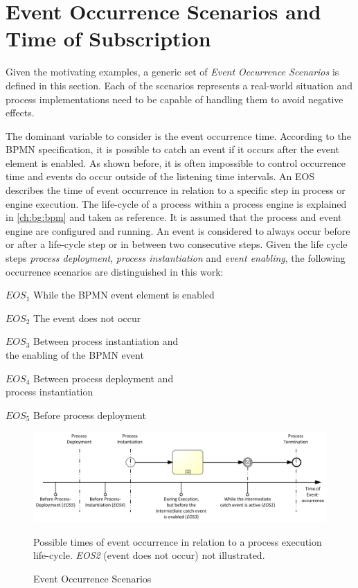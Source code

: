 \section{Event Occurrence Scenarios and Time of Subscription}\label{ch:ps:eos}
Given the motivating examples, a generic set of \textit{Event Occurrence Scenarios} is defined in this section. 
Each of the scenarios represents a real-world situation and process implementations need to be capable of handling them to avoid negative effects.

\medskip \noindent
The dominant variable to consider is the event occurrence time.
According to the BPMN specification, it is possible to catch an event if it occurs after the event element is enabled. As shown before, it is often impossible to control occurrence time and events do occur outside of the listening time intervals.
An \ac{EOS} describes the time of event occurrence in relation to a specific step in process or engine execution.
The life-cycle of a process within a process engine is explained in \autoref{ch:bg:bpm} and taken as reference. It is assumed that the process and event engine are configured and running.
An event is considered to always occur before or after a life-cycle step or in between two consecutive steps. 
Given the life cycle steps \textit{process deployment}, \textit{process instantiation} and \textit{event enabling}, the following occurrence scenarios are distinguished in this work:

\begin{aenumerate}
	\item[$EOS_{1}$] While the BPMN event element is enabled
	\item[$EOS_{2}$] The event does not occur
	\item[$EOS_{3}$] Between process instantiation and \\the enabling of the BPMN event
	\item[$EOS_{4}$] Between process deployment and \\process instantiation
	\item[$EOS_{5}$] Before process deployment
\end{aenumerate}\label{def:occurrence-times}

\begin{figure}[]
	\myfloatalign
	{\includegraphics[width=1\linewidth]{chapters/requirements/timeline_event-occurrence.png}}
	\caption{Event Occurrence Scenarios}{Possible times of event occurrence in relation to a process execution life-cycle. \textit{EOS2} (event does not occur) not illustrated.}
	\label{fig:occurrence-timeline}
\end{figure}

